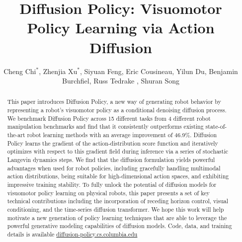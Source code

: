 \documentclass[Afour,sageh,times]{sagej}
\begin{document}

\title{Diffusion Policy: Visuomotor Policy Learning via Action Diffusion}


\author{Cheng Chi$^{*}$, Zhenjia Xu$^{*}$, Siyuan Feng, Eric Cousineau, Yilun Du,  Benjamin Burchfiel, Russ Tedrake , Shuran Song}




\begin{abstract} This paper introduces Diffusion Policy, a new way of generating robot behavior by representing a robot's visuomotor policy as a conditional denoising diffusion process. We benchmark Diffusion Policy across 15 different tasks from 4 different robot manipulation benchmarks and find that it consistently outperforms existing state-of-the-art robot learning methods with an average improvement of 46.9\%. 
Diffusion Policy learns the gradient of the action-distribution score function and iteratively optimizes with respect to this gradient field during inference via a series of stochastic Langevin dynamics steps.
We find that the diffusion formulation yields powerful advantages when used for robot policies, including gracefully handling multimodal action distributions, being suitable for high-dimensional action spaces, and exhibiting impressive training stability.
To fully unlock the potential of diffusion models for visuomotor policy learning on physical robots, this paper presents a set of key technical contributions including the incorporation of receding horizon control, visual conditioning, and the time-series diffusion transformer. 
We hope this work will help motivate a new generation of policy learning techniques that are able to leverage the powerful generative modeling capabilities of diffusion models. Code, data, and training details is available \url{diffusion-policy.cs.columbia.edu}
\end{abstract}


\end{document}
